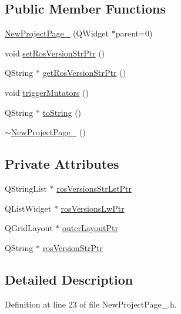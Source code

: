 \subsection*{Public Member Functions}
\begin{DoxyCompactItemize}
\item 
\hyperlink{class_new_project_page__1_a07325313c0bd209fbb9062e779276cff}{New\-Project\-Page\-\_} (Q\-Widget $\ast$parent=0)
\item 
void \hyperlink{class_new_project_page__1_a49402d5661fd96e07e285dc7d2605d9a}{set\-Ros\-Version\-Str\-Ptr} ()
\item 
Q\-String $\ast$ \hyperlink{class_new_project_page__1_a1c3596224d1afd5eba915c537648c3e7}{get\-Ros\-Version\-Str\-Ptr} ()
\item 
void \hyperlink{class_new_project_page__1_ac71e31a9a906f731b70711346bfa262d}{trigger\-Mutators} ()
\item 
Q\-String $\ast$ \hyperlink{class_new_project_page__1_aa83d0dab668fb77a30a2275b59d654e0}{to\-String} ()
\item 
\hyperlink{class_new_project_page__1_a716011001a4f599c2b7f2d53c0429dfb}{$\sim$\-New\-Project\-Page\-\_} ()
\end{DoxyCompactItemize}
\subsection*{Private Attributes}
\begin{DoxyCompactItemize}
\item 
Q\-String\-List $\ast$ \hyperlink{class_new_project_page__1_a63e7e74af698edd3d4b72ed84864ad87}{ros\-Versions\-Str\-Lst\-Ptr}
\item 
Q\-List\-Widget $\ast$ \hyperlink{class_new_project_page__1_a45bba5023ff9ebd180cc0be64367b37a}{ros\-Versions\-Lw\-Ptr}
\item 
Q\-Grid\-Layout $\ast$ \hyperlink{class_new_project_page__1_a809165b50ce35fa0812179209aba9294}{outer\-Layout\-Ptr}
\item 
Q\-String $\ast$ \hyperlink{class_new_project_page__1_a0929e17b526e8267f97a6ec6f0f3b629}{ros\-Version\-Str\-Ptr}
\end{DoxyCompactItemize}


\subsection{Detailed Description}


Definition at line 23 of file New\-Project\-Page\-\_.\-h.



